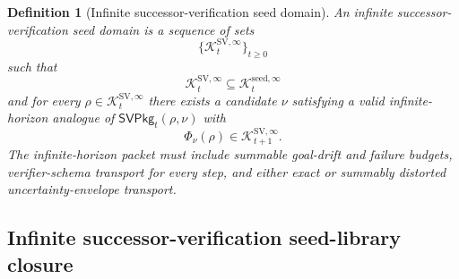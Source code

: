 \documentclass[11pt]{article}
\newtheorem{definition}[theorem]{Definition}
\newcommand{\1}{\mathbf{1}}
\providecommand{\Kcal}{\mathcal{K}}
\begin{document}
\begin{definition}[Infinite successor-verification seed domain]
\label{def:batch12b_infinite_sv_seed_domain}
An infinite successor-verification seed domain is a sequence of sets
\[
\{\Kcal_t^{\mathrm{SV},\infty}\}_{t\ge0}
\]
such that
\[
\Kcal_t^{\mathrm{SV},\infty}\subseteq\Kcal_t^{\mathrm{seed},\infty}
\]
and for every \(\rho\in\Kcal_t^{\mathrm{SV},\infty}\) there exists a candidate \(\nu\) satisfying a valid infinite-horizon analogue of \(\mathsf{SVPkg}_t(\rho,\nu)\) with
\[
\Phi_\nu(\rho)\in\Kcal_{t+1}^{\mathrm{SV},\infty}.
\]
The infinite-horizon packet must include summable goal-drift and failure budgets, verifier-schema transport for every step, and either exact or summably distorted uncertainty-envelope transport.
\end{definition}



\subsection{Infinite successor-verification seed-library closure}
\label{subsec:batch12b_infinite_sv_seed_library_closure}
\end{document}
